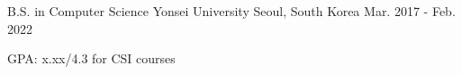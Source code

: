 

\begin{cventries}

  \cventry
    {B.S. in Computer Science} %
    {Yonsei University} %
    {Seoul, South Korea} %
    {Mar. 2017 - Feb. 2022} %
    {
      \begin{cvitems} %
        \item {GPA: x.xx/4.3 for CSI courses}
      \end{cvitems}
    }

\end{cventries}
